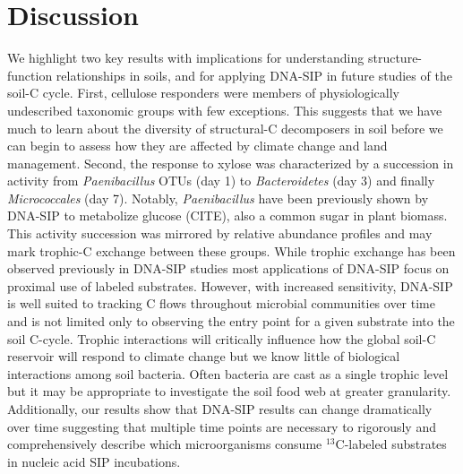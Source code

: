 \section{Discussion} 
We highlight two key results with implications for understanding structure-function
relationships in soils, and for applying DNA-SIP in future studies of the soil-C
cycle. First, cellulose responders were members of physiologically undescribed
taxonomic groups with few exceptions. This suggests that we have much to learn
about the diversity of structural-C decomposers in soil before we can begin to
assess how they are affected by climate change and land management. Second, the
response to xylose was characterized by a succession in activity from
\textit{Paenibacillus} OTUs (day 1) to \textit{Bacteroidetes} (day 3) and finally
\textit{Micrococcales} (day 7). Notably,  \textit{Paenibacillus} have been
previously shown by DNA-SIP to metabolize glucose (CITE), also a common 
sugar in plant biomass. This activity succession was mirrored
by relative abundance profiles and may mark trophic-C exchange between these
groups. While trophic exchange has been observed previously in DNA-SIP studies
\citep{lueders2004b} most applications of DNA-SIP focus on proximal use of
labeled substrates. However, with increased sensitivity, DNA-SIP is well suited
to tracking C flows throughout microbial communities over time and is not
limited only to observing the entry point for a given substrate into the soil
C-cycle.  Trophic interactions will critically influence how the global soil-C
reservoir will respond to climate change \citep{Crowther2015} but we know
little of biological interactions among soil bacteria. Often bacteria are cast
as a single trophic level \citep{Moore1988} but it may be appropriate to
investigate the soil food web at greater granularity. Additionally, our results
show that DNA-SIP results can change dramatically over time suggesting that
multiple time points are necessary to rigorously and comprehensively describe
which microorganisms consume $^{13}$C-labeled substrates in nucleic acid SIP
incubations.

